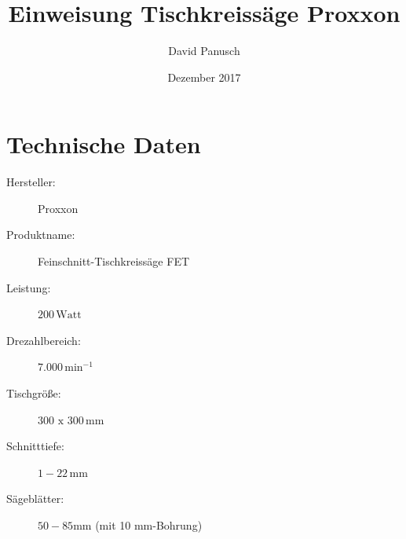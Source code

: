 \documentclass{\basedir/fablab-document}
\date{Dezember 2017}
\author{David Panusch}
\title{Einweisung Tischkreissäge Proxxon}
\begin{document}
\dosecttoc
\faketableofcontents
{}
\maketitle

\section{Technische Daten}
\begin{description}
	
    \item[Hersteller:] Proxxon
    \item[Produktname:] Feinschnitt-Tischkreissäge FET
    \item[Leistung:] $200\,\mathrm{Watt}$
    \item[Drezahlbereich:] $7.000\,\mathrm{min}^{-1}$
    \item[Tischgröße:] $300 \mathrm{\,\,x\,\,} 300\,\mathrm{mm}$
    \item[Schnitttiefe:] $1 - 22\,\mathrm{mm}$ 
    \item[Sägeblätter:] $50 - 85 \mathrm{mm}$ (mit 10 mm-Bohrung)
    
\end{description}
\end{document}
